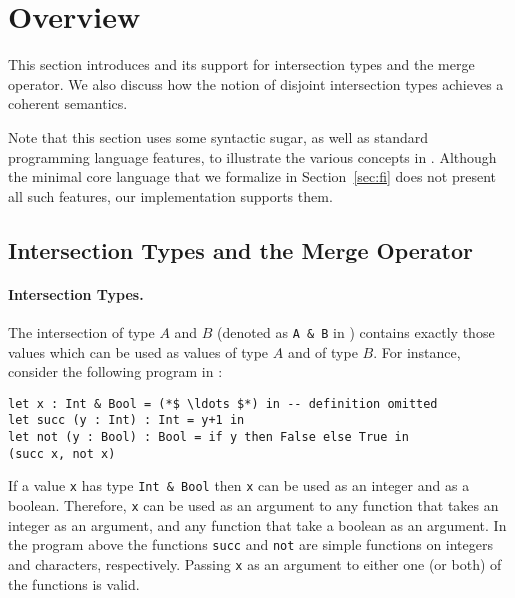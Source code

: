 \section{Overview} \label{sec:overview}

This section introduces \name and its support for intersection types and the
merge operator. We also discuss how the 
notion of disjoint intersection types achieves a coherent semantics.

Note that this section uses some syntactic sugar, as well as standard
programming language features, to illustrate the various concepts in
\name. Although the minimal core language that we formalize in
Section~\ref{sec:fi} does not present all such features, our implementation
supports them.

\subsection{Intersection Types and the Merge Operator}


\paragraph{Intersection Types.}
The intersection of type $A$ and $B$ (denoted as \lstinline{A & B} in
\name) contains exactly those values
which can be used as values of type $A$ and of type $B$. For instance,
consider the following program in \name:

\begin{lstlisting}
let x : Int & Bool = (*$ \ldots $*) in -- definition omitted
let succ (y : Int) : Int = y+1 in
let not (y : Bool) : Bool = if y then False else True in
(succ x, not x)
\end{lstlisting}

\noindent If a value \lstinline{x} has type \lstinline{Int & Bool} then
\lstinline{x} can be used as an integer and as a boolean. Therefore,
\lstinline{x} can be used as an argument to any function that takes
an integer as an argument, and any
function that take a boolean as an argument. In the program above
the functions \lstinline{succ} and \lstinline{not} are 
simple functions on integers and characters, respectively.
Passing \lstinline{x} as an argument to either one (or both) of the
functions is valid.

